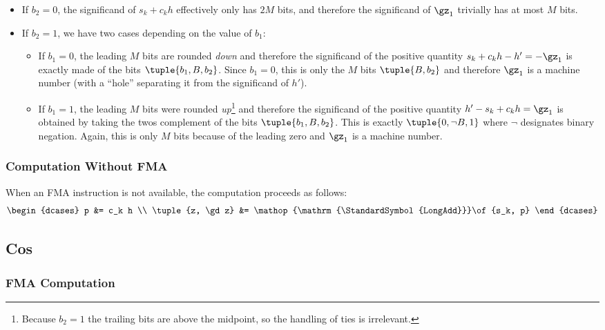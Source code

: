\documentclass[10pt, a4paper, twoside]{basestyle}
\DeclareMathOperator{\longadd}{\StandardSymbol{LongAdd}}
\begin{document}
\begin{itemize}
\item If $b_2 = 0$, the significand of $s_k + c_k h$ effectively only has $2 M$ bits, and therefore the significand of $\gz_1$ trivially has at most $M$ bits.
\item If $b_2 = 1$, we have two cases depending on the value of $b_1$:
\begin{itemize}
\item If $b_1 = 0$, the leading $M$ bits are rounded \emph{down} and therefore the significand of the positive quantity $s_k + c_k h - h' = -\gz_1$ is exactly made of the bits $\tuple{b_1, B, b_2}$.  Since $b_1 = 0$, this is only the $M$ bits $\tuple{B, b_2}$ and therefore $\gz_1$ is a machine number (with a ``hole'' separating it from the significand of $h'$).
\item If $b_1 = 1$, the leading $M$ bits were rounded \emph{up}\footnote{Because $b_2 = 1$ the trailing bits are above the midpoint, so the handling of ties is irrelevant.} and therefore the significand of the positive quantity $h' - s_k + c_k h = \gz_1$ is obtained by taking the twos complement of the bits $\tuple{b_1, B, b_2}$.  This is exactly $\tuple{0, \neg B, 1}$ where $\neg$ designates binary negation.  Again, this is only $M$ bits because of the leading zero and $\gz_1$ is a machine number.
\end{itemize}
\end{itemize}

\subsubsection*{Computation Without FMA}

When an FMA instruction is not available, the computation proceeds as follows:
\[
\begin{dcases}
p &= c_k h \\
\tuple{z, \gd z} &= \longadd\of{s_k, p}
\end{dcases}
\]

\subsection*{Cos}

\subsubsection*{FMA Computation}
\end{document}
